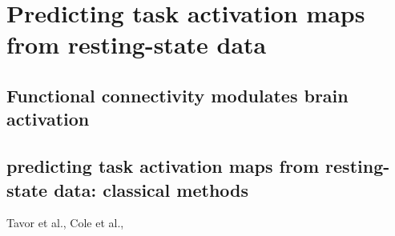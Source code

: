 










\chapter{Predicting task activation maps from resting-state data}\label{chapter1_activation_maps}

\section{Functional connectivity modulates brain activation}
\section{predicting task activation maps from resting-state data: classical methods}
Tavor et al., Cole et al.,
